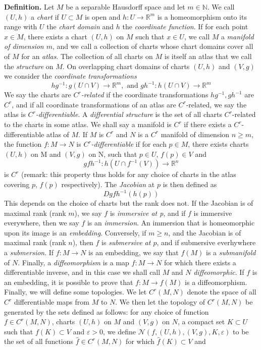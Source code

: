 \documentclass[11pt, a4paper]{memoir}
\newcommand{\mN}{\mathbb{N}}
\newcommand{\mR}{\mathbb{R}}
\begin{document}
\textbf{Definition.} Let $M$ be a separable Hausdorff space and let $m\in \mN$. We call $(U,h)$ a \textit{chart} if $U\subset M$ is open and $h: U\to \mR^m$ is a homeomorphism onto its range with $U$ the \textit{chart domain} and $h$ the \textit{coordinate function}. If for each point $x\in M$, there exists a chart $(U,h)$ on $M$ such that $x\in U$, we call $M$ a \textit{manifold of dimension $m$}, and we call a collection of charts whose chart domains cover all of $M$ for an \textit{atlas}. The collection of all charts on $M$ is itself an atlas that we call the \textit{structure} on $M$. On overlapping chart domains of charts $(U,h)$ and $(V,g)$ we consider the \textit{coordinate transformations}
$$hg^{-1}: g(U\cap V)\to \mR^m, \text{ and } gh^{-1}: h(U\cap V)\to \mR^m$$
We say the charts are \textit{$C^r$-related} if the coordinate transformations $hg^{-1}, gh^{-1}$ are $C^r$, and if all coordinate transformations of an atlas are $C^r$-related, we say the atlas is \textit{$C^r$-differentiable}. A \textit{differential structure} is the set of all charts $C^r$-related to the charts in some atlas. We shall say a manifold is $C^r$ if there exists a $C^r$-differentiable atlas of $M$. If $M$ is $C^r$ and $N$ is a $C^r$ manifold of dimension $n\geq m$, the function $f: M\to N$ is \textit{$C^r$-differentiable} if for each $p\in M$, there exists charts $(U,h)$ on M and $(V,g)$ on N, such that $p\in U$, $f(p)\in V$ and 
$$gfh^{-1}: h(U\cap f^{-1}(V))\to \mR^n$$
is $C^r$ (remark: this property thus holds for any choice of charts in the atlas covering $p$, $f(p)$ respectively). The \textit{Jacobian} at $p$ is then defined as 
$$Dgfh^{-1}(h(p))$$
This depends on the choice of charts but the rank does not. If the Jacobian is of maximal rank (rank $m$), we say $f$ is \textit{immersive at p}, and if $f$ is immersive everywhere, then we say $f$ is an \textit{immersion}. An immersion that is homeomorphic upon its image is an \textit{embedding}. Conversely, if $m\geq n$, and the Jacobian is of maximal rank (rank $n$), then $f$ is \textit{submersive at $p$}, and if submersive everhywhere a \textit{submersion}. If $f: M\to N$ is an embedding, we say that $f(M)$ is a \textit{submanifold} of $N$. Finally, a \textit{diffeomorphism} is a map $f:M\to N$ for which there exists a differentiable inverse, and in this case we shall call $M$ and $N$ \textit{diffeomorphic}. If $f$ is an embedding, it is possible to prove that $f:M\to f(M)$ is a diffeomorphism. Finally, we will define some topologies. We let $C^r(M,N)$ denote the space of all $C^r$ differentiable maps from $M$ to $N$. We then let the topology of $C^r(M,N)$ be generated by the sets defined as follows: for any choice of function $f\in C^r(M,N)$, charts $(U,h)$ on $M$ and $(V,g)$ on $N$, a compact set $K\subset U$ such that $f(K)\subset V$ and $\varepsilon>0$, we define $\mathcal{N}(f,(U,h),(V,g),K,\varepsilon)$ to be the set of all functions $\hat{f}\in C^r(M,N)$ for which $\hat{f}(K)\subset V$ and
\end{document}
